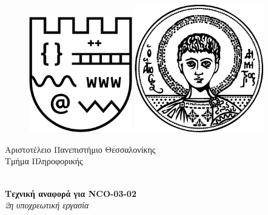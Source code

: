 \begin{titlepage}

    \begin{figure}[!htb]
        \centering
        \begin{minipage}{0.45\textwidth}
            \centering
            \includegraphics[width=0.4\textwidth]{images/logo_csd.png} %
        \end{minipage}\hfill
        \begin{minipage}{0.45\textwidth}
            \centering
            \includegraphics[width=0.5\textwidth]{images/logo_auth.png} %
        \end{minipage}
    \end{figure}
     
    \begin{center}
        \LARGE{Αριστοτέλειο Πανεπιστήμιο Θεσσαλονίκης}
        \vspace{5mm}
        \\ \Large{Τμήμα Πληροφορικής}
    \end{center}
    
    \vspace*{\fill}
    
    \begin{center}
        \Rule \\[0.4cm]
        { \LARGE 
            \textbf{Τεχνική αναφορά για NCO-03-02}\\[0.4cm]
            \emph{2η υποχρεωτική εργασία}\\[0.4cm]
        }
        \Rule \\[0.4cm]
    \end{center}
    

\end{titlepage}
